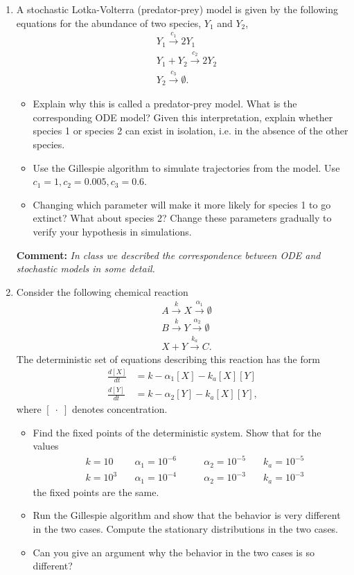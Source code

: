 \documentclass[12pt]{article}
\newcommand{\stc}{\stackrel}
\begin{document}
\begin{enumerate}
\item  A stochastic Lotka-Volterra (predator-prey) model is given by the following equations for the abundance of
two species, $Y_1$ and $Y_2$,
\begin{align*}
&Y_1 \stc{c_1}{\longrightarrow} 2 Y_1 \\
&Y_1 + Y_2 \stc{c_2}{\longrightarrow} 2 Y_2  \\
& Y_2 \stc{c_3}{\longrightarrow} \emptyset.
\end{align*}
\begin{itemize}
\item Explain why this is called a predator-prey model.  What is the corresponding ODE model? 
Given this interpretation, explain whether species 1 or species 2 can exist in isolation, i.e. in the 
absence of the other species.
\item Use the Gillespie algorithm to simulate trajectories from the model. Use
$c_1 = 1, c_2 = 0.005, c_3 = 0.6$.
\item Changing which parameter will make it more likely for species 1 to go extinct?  What about species 2?
Change these parameters gradually to verify your hypothesis in simulations.
\end{itemize}

{\bf Comment:} \emph{In class we described the correspondence between ODE and stochastic models
in some detail.}

\item Consider the following chemical reaction
\begin{align*}
&A \stc{k}{\longrightarrow} X \stc{\alpha_1}{\longrightarrow} \emptyset\\
&B \stc{k}{\longrightarrow} Y \stc{\alpha_2}{\longrightarrow}  \emptyset \\
& X + Y \stc{k_a}{\longrightarrow} C.
\end{align*}
The deterministic set of equations describing this reaction has the form
\begin{align*}
\frac{d [X]}{dt} &= k - \alpha_1 [X] - k_a [X] [Y] \\
\frac{d [Y]}{dt} &= k - \alpha_2 [Y] - k_a[X] [Y] ,
\end{align*}
where $[\;\cdot\;]$ denotes concentration.
\begin{itemize}
\item Find the fixed points of the deterministic system.  Show that for 
the values
\begin{align*}
& k = 10 \quad & \alpha_1 = 10^{-6} \qquad & \alpha_2 = 10^{-5} \quad & k_a = 10^{-5}  \\
& k = 10^3 \quad & \alpha_1 = 10^{-4} \qquad & \alpha_2 = 10^{-3} \quad & k_a = 10^{-3}
\end{align*}
the fixed points are the same.
\item Run the Gillespie algorithm and show that the behavior is very different in the two cases.
Compute the stationary distributions in the two cases.
\item Can you give an argument why the behavior in the two cases is so different?
\end{itemize}


\end{enumerate}
\end{document}
